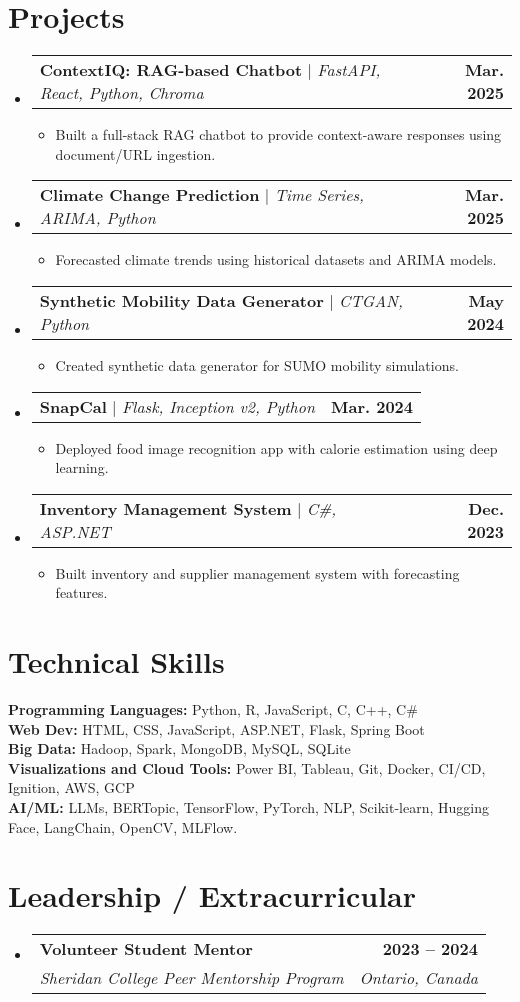 \documentclass[letterpaper,11pt]{article}
\makeatletter
\newcommand{\resumeItem}[1]{\item\small{{#1 \vspace{-2pt}}}}
\newcommand{\resumeSubheading}[4]{\vspace{-2pt}\item
    \begin{tabular*}{1.0\textwidth}[t]{l@{\extracolsep{\fill}}r}
      \textbf{#1} & \textbf{\small #2} \\
      \textit{\small#3} & \textit{\small #4} \\
    \end{tabular*}\vspace{-7pt}}
\newcommand{\resumeProjectHeading}[2]{\item
    \begin{tabular*}{1.001\textwidth}{l@{\extracolsep{\fill}}r}
      \small#1 & \textbf{\small #2}\\
    \end{tabular*}\vspace{-7pt}}
\newcommand{\resumeItemListStart}{\begin{itemize}}
\newcommand{\resumeItemListEnd}{\end{itemize}\vspace{-5pt}}
\newcommand{\resumeSubHeadingListStart}{\begin{itemize}[leftmargin=0.0in, label={}]}
\newcommand{\resumeSubHeadingListEnd}{\end{itemize}}
\makeatother
\begin{document}
\section{Projects}
  \resumeSubHeadingListStart
    \resumeProjectHeading
      {\textbf{ContextIQ: RAG-based Chatbot} $|$ \emph{FastAPI, React, Python, Chroma}}{Mar. 2025}
      \resumeItemListStart
        \resumeItem{Built a full-stack RAG chatbot to provide context-aware responses using document/URL ingestion.}
      \resumeItemListEnd
    \resumeProjectHeading
      {\textbf{Climate Change Prediction} $|$ \emph{Time Series, ARIMA, Python}}{Mar. 2025}
      \resumeItemListStart
        \resumeItem{Forecasted climate trends using historical datasets and ARIMA models.}
      \resumeItemListEnd
    \resumeProjectHeading
      {\textbf{Synthetic Mobility Data Generator} $|$ \emph{CTGAN, Python}}{May 2024}
      \resumeItemListStart
        \resumeItem{Created synthetic data generator for SUMO mobility simulations.}
      \resumeItemListEnd
    \resumeProjectHeading
      {\textbf{SnapCal} $|$ \emph{Flask, Inception v2, Python}}{Mar. 2024}
      \resumeItemListStart
        \resumeItem{Deployed food image recognition app with calorie estimation using deep learning.}
      \resumeItemListEnd
    \resumeProjectHeading
      {\textbf{Inventory Management System} $|$ \emph{C\#, ASP.NET}}{Dec. 2023}
      \resumeItemListStart
        \resumeItem{Built inventory and supplier management system with forecasting features.}
      \resumeItemListEnd
  \resumeSubHeadingListEnd

\section{Technical Skills}
 \begin{itemize}[leftmargin=0.15in, label={}]
  \small{\item{
   \textbf{Programming Languages:} Python, R, JavaScript, C, C++, C\# \\
   \textbf{Web Dev:} HTML, CSS, JavaScript, ASP.NET, Flask, Spring Boot \\
   \textbf{Big Data:} Hadoop, Spark, MongoDB, MySQL, SQLite \\
   \textbf{Visualizations and Cloud Tools:} Power BI, Tableau, Git, Docker, CI/CD, Ignition, AWS, GCP \\
   \textbf{AI/ML:} LLMs, BERTopic, TensorFlow, PyTorch, NLP, Scikit-learn, Hugging Face, LangChain, OpenCV, MLFlow.
  }}
 \end{itemize}

\section{Leadership / Extracurricular}
  \resumeSubHeadingListStart
    \resumeSubheading
      {Volunteer Student Mentor}{2023 -- 2024}
      {Sheridan College Peer Mentorship Program}{Ontario, Canada}
  \resumeSubHeadingListEnd
\end{document}

